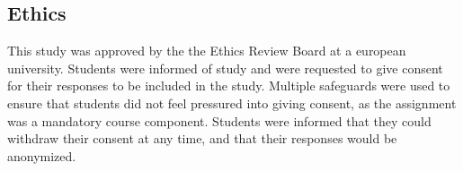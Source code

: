 \subsection{Ethics}
\label{ssec:ethics}
This study was approved by the the Ethics Review Board at a european university\anonfoot. Students were informed of study and were requested to give consent for their responses to be included in the study. Multiple safeguards were used to ensure that students did not feel pressured into giving consent, as the assignment was a mandatory course component. Students were informed that they could withdraw their consent at any time, and that their responses would be anonymized. 






